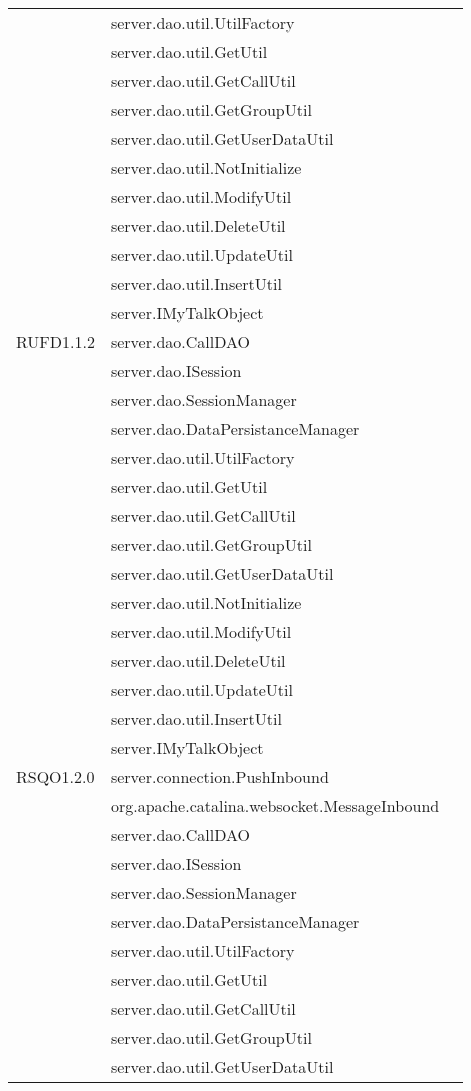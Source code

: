 \begin{center}
\begin{longtable}{lp{}l}
& server.dao.util.UtilFactory\\
& server.dao.util.GetUtil\\
& server.dao.util.GetCallUtil\\
& server.dao.util.GetGroupUtil\\
& server.dao.util.GetUserDataUtil\\
& server.dao.util.NotInitialize\\
& server.dao.util.ModifyUtil\\
& server.dao.util.DeleteUtil\\
& server.dao.util.UpdateUtil\\
& server.dao.util.InsertUtil\\
& server.IMyTalkObject\\
RUFD1.1.2 & server.dao.CallDAO\\
& server.dao.ISession\\
& server.dao.SessionManager\\
& server.dao.DataPersistanceManager\\
& server.dao.util.UtilFactory\\
& server.dao.util.GetUtil\\
& server.dao.util.GetCallUtil\\
& server.dao.util.GetGroupUtil\\
& server.dao.util.GetUserDataUtil\\
& server.dao.util.NotInitialize\\
& server.dao.util.ModifyUtil\\
& server.dao.util.DeleteUtil\\
& server.dao.util.UpdateUtil\\
& server.dao.util.InsertUtil\\
& server.IMyTalkObject\\
RSQO1.2.0 & server.connection.PushInbound\\
& org.apache.catalina.websocket.MessageInbound\\
 & server.dao.CallDAO\\
& server.dao.ISession\\
& server.dao.SessionManager\\
& server.dao.DataPersistanceManager\\
& server.dao.util.UtilFactory\\
& server.dao.util.GetUtil\\
& server.dao.util.GetCallUtil\\
& server.dao.util.GetGroupUtil\\
& server.dao.util.GetUserDataUtil\\

\end{longtable}
\end{center}
